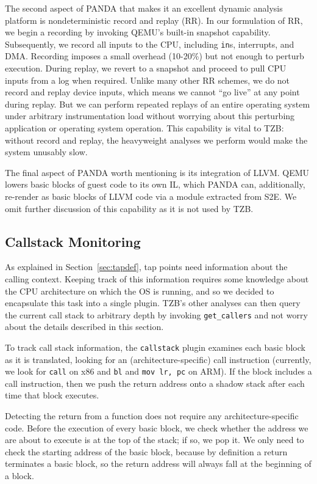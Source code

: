 The second aspect of PANDA that makes it an excellent dynamic analysis
platform is nondeterministic record and replay (RR). In our formulation
of RR, we begin a recording by invoking QEMU's built-in snapshot
capability. Subsequently, we record all inputs to the CPU, including
\texttt{in}s, interrupts, and DMA. Recording imposes a small overhead (10-20\%)
but not enough to perturb execution. During replay, we revert to a
snapshot and proceed to pull CPU inputs from a log when required.
Unlike many other RR schemes, we do not record and replay device inputs,
which means we cannot ``go live'' at any point during replay. But we
can perform repeated replays of an entire operating system under
arbitrary instrumentation load without worrying about this perturbing
application or operating system operation. This capability is vital to
TZB: without record and replay, the heavyweight analyses we perform
would make the system unusably slow.

The final aspect of PANDA worth mentioning is its integration of LLVM.
QEMU lowers basic blocks of guest code to its own IL, which PANDA can,
additionally, re-render as basic blocks of LLVM code via a module 
extracted from S2E. We omit further discussion of this capability
as it is not used by TZB.

\subsection{Callstack Monitoring}
\label{sec:implementation:subsec:callstack}

As explained in Section~\ref{sec:tapdef}, tap points need information
about the calling context. Keeping track of this information requires
some knowledge about the CPU architecture on which the OS is running,
and so we decided to encapsulate this task into a single plugin. TZB's
other analyses can then query the current call stack to arbitrary depth
by invoking \texttt{get\_callers} and not worry about the details
described in this section.

To track call stack information, the \texttt{callstack} plugin examines
each basic block as it is translated, looking for an
(architecture-specific) call instruction (currently, we look for
\texttt{call} on x86 and \texttt{bl} and \texttt{mov lr, pc} on ARM). If
the block includes a call instruction, then we push the return address
onto a shadow stack after each time that block executes.

Detecting the return from a function does not require any
architecture-specific code. Before the execution of every basic block,
we check whether the address we are about to execute is at the top of
the stack; if so, we pop it. We only need to check the starting address
of the basic block, because by definition a return terminates a basic
block, so the return address will always fall at the beginning of a
block.

